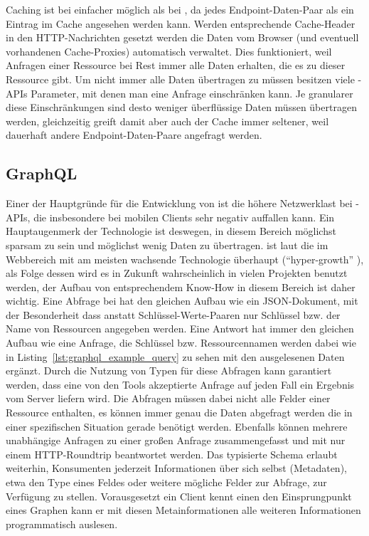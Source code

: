 Caching ist bei  einfacher möglich als bei , da jedes Endpoint-Daten-Paar als ein Eintrag im Cache angesehen werden kann. Werden entsprechende Cache-Header in den HTTP-Nachrichten gesetzt werden die Daten vom Browser (und eventuell vorhandenen Cache-Proxies) automatisch verwaltet. Dies funktioniert, weil Anfragen einer Ressource bei Rest immer alle Daten erhalten, die es zu dieser Ressource gibt. Um nicht immer alle Daten übertragen zu müssen besitzen viele -APIs Parameter, mit denen man eine Anfrage einschränken kann. Je granularer diese Einschränkungen sind desto weniger überflüssige Daten müssen übertragen werden, gleichzeitig greift damit aber auch der Cache immer seltener, weil dauerhaft andere Endpoint-Daten-Paare angefragt werden.

\subsection{GraphQL}
Einer der Hauptgründe für die Entwicklung von  ist die höhere Netzwerklast bei -APIs, die insbesondere bei mobilen Clients sehr negativ auffallen kann. Ein Hauptaugenmerk der Technologie ist deswegen, in diesem Bereich möglichst sparsam zu sein und möglichst wenig Daten zu übertragen.
 ist laut  die im Webbereich mit am meisten wachsende Technologie überhaupt (``hyper-growth'' \parencite[unteres Drittel]{npmjs_2018}), als Folge dessen wird es in Zukunft wahrscheinlich in vielen Projekten benutzt werden, der Aufbau von entsprechendem Know-How in diesem Bereich ist daher wichtig.
Eine Abfrage bei  hat den gleichen Aufbau wie ein JSON-Dokument, mit der Besonderheit dass anstatt Schlüssel-Werte-Paaren nur Schlüssel bzw. der Name von Ressourcen angegeben werden. Eine Antwort hat immer den gleichen Aufbau wie eine Anfrage, die Schlüssel bzw. Ressourcennamen werden dabei wie in Listing~\ref{lst:graphql_example_query} zu sehen mit den ausgelesenen Daten ergänzt. Durch die Nutzung von Typen für diese Abfragen kann garantiert werden, dass eine von den Tools akzeptierte Anfrage auf jeden Fall ein Ergebnis vom Server liefern wird. Die Abfragen müssen dabei nicht alle Felder einer Ressource enthalten, es können immer genau die Daten abgefragt werden die in einer spezifischen Situation gerade benötigt werden. Ebenfalls können mehrere unabhängige Anfragen zu einer großen Anfrage zusammengefasst und mit nur einem HTTP-Roundtrip beantwortet werden.
Das typisierte Schema erlaubt weiterhin, Konsumenten jederzeit Informationen über sich selbst (Metadaten), etwa den Type eines Feldes oder weitere mögliche Felder zur Abfrage, zur Verfügung zu stellen. Vorausgesetzt ein Client kennt einen den Einsprungpunkt eines Graphen kann er mit diesen Metainformationen alle weiteren Informationen programmatisch auslesen. 

